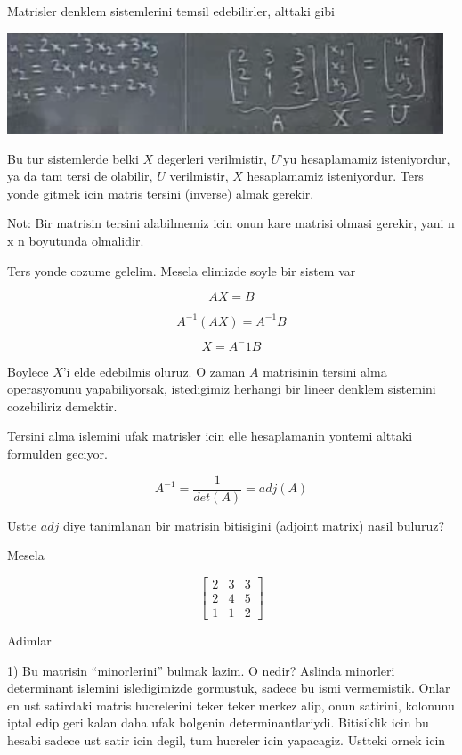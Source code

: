 \documentclass[12pt,fleqn]{article}\usepackage{../common}
\begin{document}
Matrisler denklem sistemlerini temsil edebilirler, alttaki gibi

\includegraphics[height=3cm]{3_5.png}

Bu tur sistemlerde belki $X$ degerleri verilmistir, $U$'yu hesaplamamiz
isteniyordur, ya da tam tersi de olabilir, $U$ verilmistir, $X$
hesaplamamiz isteniyordur. Ters yonde gitmek icin matris tersini (inverse)
almak gerekir.

Not: Bir matrisin tersini alabilmemiz icin onun kare matrisi olmasi gerekir,
yani n x n boyutunda olmalidir. 

Ters yonde cozume gelelim. Mesela elimizde soyle bir sistem var

\[  AX = B\]

\[  A^{-1}(AX) = A^{-1}B\]

\[  X = A^{-}1B\]

Boylece $X$'i elde edebilmis oluruz. O zaman $A$ matrisinin tersini alma
operasyonunu yapabiliyorsak, istedigimiz herhangi bir lineer denklem
sistemini cozebiliriz demektir. 

Tersini alma islemini ufak matrisler icin elle hesaplamanin yontemi alttaki
formulden geciyor. 

\[ A^{-1} = \frac{1}{det(A)}  = adj(A)\]

Ustte $adj$ diye tanimlanan bir matrisin bitisigini (adjoint matrix) nasil
buluruz?

Mesela

\[ 
\left[\begin{array}{rrr}
2 & 3 & 3 \\
2 & 4 & 5 \\
1 & 1 & 2
\end{array}\right]
 \]

Adimlar

1) Bu matrisin ``minorlerini'' bulmak lazim. O nedir? Aslinda minorleri
determinant islemini isledigimizde gormustuk, sadece bu ismi vermemistik.
Onlar en ust satirdaki matris hucrelerini teker teker merkez alip, onun
satirini, kolonunu iptal edip geri kalan daha ufak bolgenin
determinantlariydi. Bitisiklik icin bu hesabi sadece ust satir icin degil,
tum hucreler icin yapacagiz. Ustteki ornek icin
\end{document}
